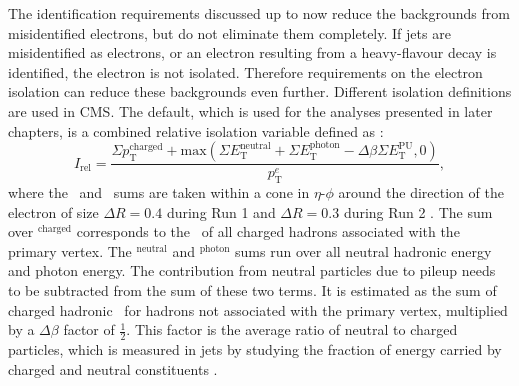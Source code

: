 The identification requirements discussed up to now reduce the backgrounds 
from misidentified electrons, but do not eliminate them completely. If jets are
misidentified as electrons, or an electron resulting from a heavy-flavour 
decay is identified, the electron is not isolated. Therefore requirements
on the electron isolation can reduce these backgrounds even further.
Different isolation definitions are used in \ac{CMS}. The default, which is
used for the analyses presented in later chapters, is a combined relative isolation variable
defined as \cite{SMHtautauCMS}:
\begin{equation}\label{eqn:electron_reliso}
I_{\text{rel}} = \frac{\Sigma p_{\text{T}}^{\text{charged}} + \mathrm{max}(\Sigma E_{\text{T}}^{\text{neutral}} + \Sigma E_{\text{T}}^{\text{photon}} - \Delta\beta \Sigma E_{\text{T}}^{\text{PU}},0)}{p_{\text{T}}^{e}},
\end{equation}
where the \pT~and \ET~sums are taken within a cone in $\eta$-$\phi$ around the direction
of the electron of size $\Delta R = 0.4$ during Run 1 and $\Delta R = 0.3$ during Run 2 \cite{CMS-PAS-HIG-16-037}.
The sum over \pT$^{\text{charged}}$ corresponds to the \pT~of all charged %
hadrons associated with the primary vertex. %
The \ET$^{\text{neutral}}$ and \ET$^{\text{photon}}$ sums
run over all neutral hadronic energy and photon energy. %
The contribution from neutral particles due to pileup needs to be subtracted from
the sum of these two terms. It is estimated as the sum of charged hadronic \pT~for hadrons not associated
with the primary vertex, multiplied by a $\Delta \beta$ factor of $\frac{1}{2}$. This factor
is the average ratio of neutral to charged particles, which is measured in jets 
by studying the fraction of energy carried by charged and neutral constituents \cite{cms-pf-2010-2}.

